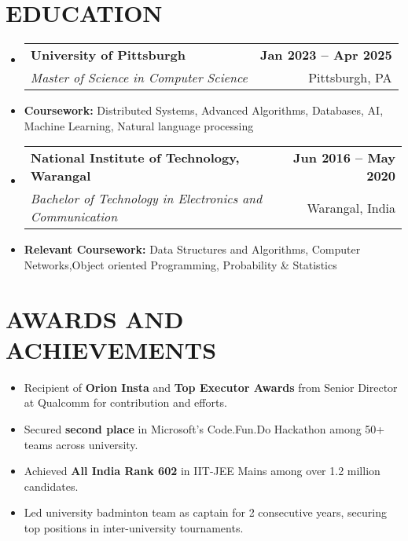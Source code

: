 \documentclass[letterpaper,10.9pt]{article}
\makeatletter
\newcommand{\resumeItem}[1]{
  \item\small{
    {#1 \vspace{-2pt}}
  }
}
\newcommand{\resumeEducationheading}[4]{
\item
    \begin{tabular*}{1.0\textwidth}[t]{l@{\extracolsep{\fill}}r}
      \hspace{-1pt}\textbf{ \small #1} & \textbf{\small #2} \\
      \textit{\small #3} & {\small #4} \\
    \end{tabular*}\vspace{-7pt}
}
\newcommand{\resumeSubSubheading}[2]{
    \vspace{-2pt}\item
    \begin{tabular*}{1.0\textwidth}{l@{\extracolsep{\fill}}r}
      \textit{#1} & \textit{#2} \\
    \end{tabular*}\vspace{-7pt}
}
\newcommand{\resumeSubHeadingListStart}{\begin{itemize}[leftmargin=0.0in, label={}]}
\newcommand{\resumeSubHeadingListEnd}{\end{itemize}}
\newcommand{\resumeItemListStart}{\begin{itemize}}
\newcommand{\resumeItemListEnd}{\end{itemize}\vspace{-7pt}}
\makeatother
\begin{document}
\section{EDUCATION} 
    \resumeSubHeadingListStart
        \resumeEducationheading
            {University of Pittsburgh}{Jan 2023 -- Apr 2025}
            {Master of Science in Computer Science}{Pittsburgh, PA}
            \resumeItem{\textbf{Coursework:} Distributed Systems, Advanced Algorithms, Databases, AI, Machine Learning, Natural language processing} 
        \resumeEducationheading
            {National Institute of Technology, Warangal}{Jun 2016 -- May 2020}
            {Bachelor of Technology in Electronics and Communication }{Warangal, India}
            \resumeItem{\textbf{Relevant Coursework:} Data Structures and Algorithms, Computer Networks,Object oriented Programming, Probability \& Statistics}
    \resumeSubHeadingListEnd


\section{AWARDS AND ACHIEVEMENTS}
\resumeSubHeadingListStart
    \resumeItemListStart      
        	\resumeItem{Recipient of \textbf{Orion Insta} and \textbf{Top Executor Awards} from Senior Director at Qualcomm for contribution and efforts.}
            
             \resumeItem{Secured \textbf{second place }in Microsoft's Code.Fun.Do Hackathon among 50+ teams across university.}
             
            \resumeItem{Achieved \textbf{All India Rank 602} in IIT-JEE  Mains among over 1.2 million candidates. }

            \resumeItem{Led university badminton team as captain for 2 consecutive years, securing top positions in inter-university tournaments.}
    \resumeItemListEnd
\resumeSubHeadingListEnd
            
  
\end{document}
